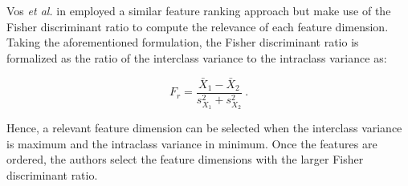 Vos \textit{et al.} in \cite{Vos2012} employed a similar feature ranking approach but make use of the Fisher discriminant ratio to compute the relevance of each feature dimension.
Taking the aforementioned formulation, the Fisher discriminant ratio is formalized as the ratio of the interclass variance to the intraclass variance as:

\begin{equation}
F_r = \frac{\bar{X}_1 - \bar{X}_2}{s^{2}_{X_1}+s^{2}_{X_2}} \ .
\label{eq:fisherratio}
\end{equation}

\noindent Hence, a relevant feature dimension can be selected when the interclass variance is maximum and the intraclass variance in minimum.
Once the features are ordered, the authors select the feature dimensions with the larger Fisher discriminant ratio.

